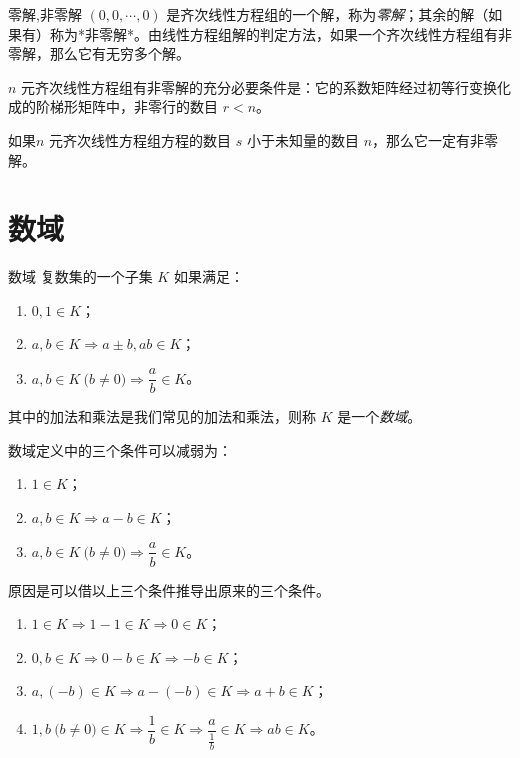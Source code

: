 \begin{definition}{零解,非零解}
	$(0, 0, \cdots, 0)$ 是齐次线性方程组的一个解，称为\emph{零解}；其余的解（如果有）称为*非零解*。由线性方程组解的判定方法，如果一个齐次线性方程组有非零解，那么它有无穷多个解。
\end{definition}

\begin{theorem}
	$n$ 元齐次线性方程组有非零解的充分必要条件是：它的系数矩阵经过初等行变换化成的阶梯形矩阵中，非零行的数目 $r < n$。
\end{theorem}

\begin{theorem}
	如果$n$ 元齐次线性方程组方程的数目 $s$ 小于未知量的数目 $n$，那么它一定有非零解。
\end{theorem}

\section{数域}

\begin{definition}{数域}
	复数集的一个子集 $K$ 如果满足：
	\begin{enumerate}
		\item $0, 1 \in K$；
		\item $a, b \in K \Longrightarrow a \pm b, ab \in K$；
		\item $a, b \in K \pod{b \ne 0} \Longrightarrow \dfrac{a}{b} \in K$。
	\end{enumerate}
	其中的加法和乘法是我们常见的加法和乘法，则称 $K$ 是一个\emph{数域}。
\end{definition}

数域定义中的三个条件可以减弱为：
\begin{enumerate}
	\item $1 \in K$；
	\item $a, b \in K \Longrightarrow a - b \in K$；
	\item $a, b \in K \pod{b \ne 0} \Longrightarrow \dfrac{a}{b} \in K$。
\end{enumerate}

原因是可以借以上三个条件推导出原来的三个条件。
\begin{enumerate}
	\item $1 \in K \Longrightarrow 1 - 1 \in K \Longrightarrow 0 \in K$；
	\item $0, b \in K \Longrightarrow 0 - b \in K \Longrightarrow -b \in K$；
	\item $a, (-b) \in K \Longrightarrow a - (-b) \in K \Longrightarrow a + b \in K$；
	\item $1, b \pod{b \ne 0} \in K \Longrightarrow \dfrac{1}{b} \in K \Longrightarrow \dfrac{a}{\frac{1}{b}} \in K \Longrightarrow ab \in K$。
\end{enumerate}

